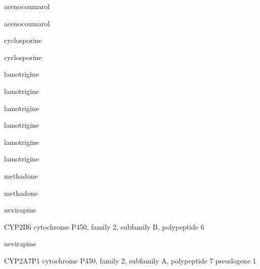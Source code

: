 \documentclass{resume} %
\begin{document}
\begin{rSection}{ acenocoumarol }
\begin{rSection}{ acenocoumarol }
\begin{rSection}{ cyclosporine }
\begin{rSection}{ cyclosporine }
\begin{rSection}{ lamotrigine }
\begin{rSection}{ lamotrigine }
\begin{rSection}{ lamotrigine }
\begin{rSection}{ lamotrigine }
\begin{rSection}{ lamotrigine }
\begin{rSection}{ lamotrigine }
\begin{rSection}{ methadone }
\begin{rSection}{ methadone }
\end{rSection}\begin{rSection}{ nevirapine }
\item[]
\begin{rSubsection}{ CYP2B6 }{ cytochrome P450, family 2, subfamily B, polypeptide 6 }{}{}
\item[]


\end{rSubsection}\begin{rSection}{ nevirapine }
\item[]
\begin{rSubsection}{ CYP2A7P1 }{ cytochrome P450, family 2, subfamily A, polypeptide 7 pseudogene 1 }{}{}
\item[]


\end{rSubsection}


\end{rSection}
\end{rSection}
\end{rSection}
\end{rSection}
\end{rSection}
\end{rSection}
\end{rSection}
\end{rSection}
\end{rSection}
\end{rSection}
\end{rSection}
\end{rSection}
\end{rSection}
\end{document}
